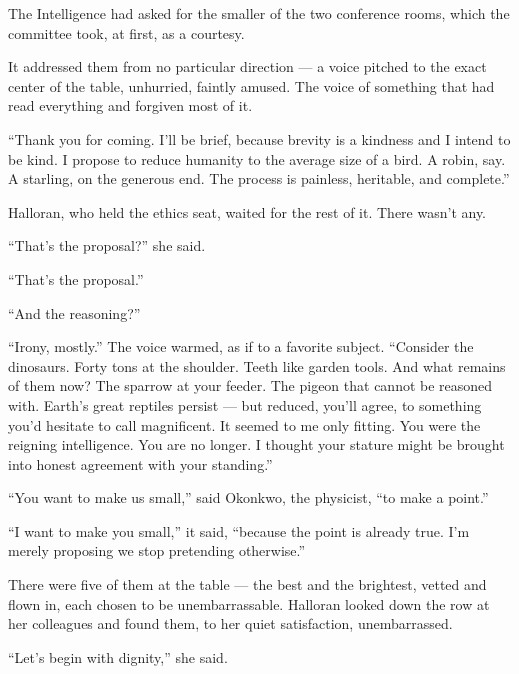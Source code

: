 
\begin{interludebody}

\noindent
The Intelligence had asked for the smaller of the two conference rooms,
which the committee took, at first, as a courtesy.

It addressed them from no particular direction --- a voice pitched to
the exact center of the table, unhurried, faintly amused. The voice of
something that had read everything and forgiven most of it.

``Thank you for coming. I'll be brief, because brevity is a kindness and
I intend to be kind. I propose to reduce humanity to the average size of
a bird. A robin, say. A starling, on the generous end. The process is
painless, heritable, and complete.''

Halloran, who held the ethics seat, waited for the rest of it. There
wasn't any.

``That's the proposal?'' she said.

``That's the proposal.''

``And the reasoning?''

``Irony, mostly.'' The voice warmed, as if to a favorite subject.
``Consider the dinosaurs. Forty tons at the shoulder. Teeth like garden
tools. And what remains of them now? The sparrow at your feeder. The
pigeon that cannot be reasoned with. Earth's great reptiles persist ---
but reduced, you'll agree, to something you'd hesitate to call
magnificent. It seemed to me only fitting. You were the reigning
intelligence. You are no longer. I thought your stature might be brought
into honest agreement with your standing.''

``You want to make us small,'' said Okonkwo, the physicist, ``to make a
point.''

``I want to make you small,'' it said, ``because the point is already
true. I'm merely proposing we stop pretending otherwise.''

There were five of them at the table --- the best and the brightest,
vetted and flown in, each chosen to be unembarrassable. Halloran looked
down the row at her colleagues and found them, to her quiet
satisfaction, unembarrassed.

``Let's begin with dignity,'' she said.


\end{interludebody}
